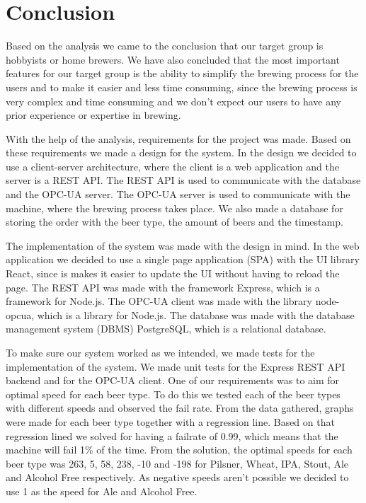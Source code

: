\section{Conclusion}
Based on the analysis we came to the conclusion that our target group is hobbyists or home brewers.
We have also concluded that the most important features for our target group is the ability to simplify the brewing process for the users and
to make it easier and less time consuming, since the brewing process is very complex and time consuming
and we don't expect our users to have any prior experience or expertise in brewing.\newline

With the help of the analysis, requirements for the project was made.
Based on these requirements we made a design for the system.
In the design we decided to use a client-server architecture, where the client is a web application and the server is a REST API.
The REST API is used to communicate with the database and the OPC-UA server.
The OPC-UA server is used to communicate with the machine, where the brewing process takes place.
We also made a database for storing the order with the beer type, the amount of beers and the timestamp.\newline

The implementation of the system was made with the design in mind.
In the web application we decided to use a single page application (SPA) with the UI library React,
since is makes it easier to update the UI without having to reload the page.
The REST API was made with the framework Express, which is a framework for Node.js.
The OPC-UA client was made with the library node-opcua, which is a library for Node.js.
The database was made with the database management system (DBMS) PostgreSQL, which is a relational database.\newline

To make sure our system worked as we intended, we made tests for the implementation of the system.
We made unit tests for the Express REST API backend and for the OPC-UA client.
One of our requirements was to aim for optimal speed for each beer type.
To do this we tested each of the beer types with different speeds and observed the fail rate.
From the data gathered, graphs were made for each beer type together with a regression line.
Based on that regression lined we solved for having a failrate of 0.99, which means that the machine will fail 1\% of the time.
From the solution, the optimal speeds for each beer type was 263, 5, 58, 238, -10 and -198 for Pilsner, Wheat, IPA, Stout, Ale and Alcohol Free respectively.
As negative speeds aren't possible we decided to use 1 as the speed for Ale and Alcohol Free.\newline